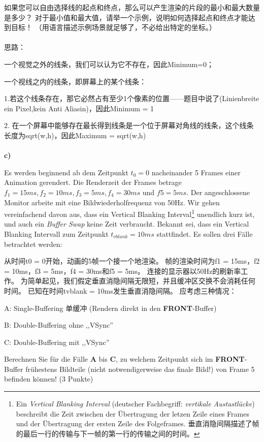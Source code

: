 \documentclass[fleqn]{article}
\begin{document}
如果您可以自由选择线的起点和终点，那么可以产生渲染的片段的最小和最大数量是多少？ 对于最小值和最大值，请举一个示例，说明如何选择起点和终点才能达到目标！ （用语言描述示例场景就足够了，不必给出特定的坐标。）
\\
\\
思路：

一个视觉之外的线条，我们可以认为它不存在，因此Minimum=0；

一个视线之内的线条，即屏幕上的某个线条：

1.若这个线条存在，那它必然占有至少1个像素的位置——题目中说了(Linienbreite ein Pixel,kein Anti Aliasin)，因此Minimum = 1

2. 在一个屏幕中能够存在最长得到线条是一个位于屏幕对角线的线条，这个线条长度为sqrt(w,h)，因此Maximum = sqrt(w,h)
\\
\\
\textbf{c)}

Es werden beginnend ab dem Zeitpunkt $t_0 = 0$ nacheinander 5 Frames einer Animation gerendert. 
 Die Renderzeit der Frames betrage $f_1 = 15ms, f_2 = 10ms, f_3 = 5ms, f_4 = 30ms$ und $f5 = 5ms$.
 Der angeschlossene Monitor arbeite mit eine Bildwiederholfrequenz von 50Hz. 
 Wir gehen vereinfachend davon aus, dass ein Vertical Blanking Interval\footnote{Ein \textit{Vertical Blanking Interval} (deutscher Fachbegriff: \textit{vertikale Austastlücke}) beschreibt die Zeit zwischen der Übertragung der letzen Zeile eines Frames und der Übertragung der ersten Zeile des Folgeframes. 垂直消隐间隔描述了帧的最后一行的传输与下一帧的第一行的传输之间的时间。} unendlich kurz ist, und auch ein \textit{Buffer Swap} keine Zeit verbraucht. Bekannt sei, dass ein Vertical Blanking Intervall zum Zeitpunkt $t_{vblank} = 10ms$ stattfindet. Es sollen drei Fälle betrachtet werden:

从时间t0 = 0开始，动画的5帧一个接一个地渲染。 帧的渲染时间为f1 = 15ms，f2 = 10ms，f3 = 5ms，f4 = 30ms和f5 = 5ms。 连接的显示器以50Hz的刷新率工作。 为简单起见，我们假定垂直消隐间隔无限短，并且缓冲区交换不会消耗任何时间。 已知在时间tvblank = 10ms发生垂直消隐间隔。 应考虑三种情况：

 A: Single-Buffering 单缓冲 (Rendern direkt in den \textbf{FRONT}-Buffer) 
 
 B: Double-Buffering ohne ,,VSync'' 
 
 C: Double-Buffering mit ,,VSync''

Berechnen Sie für die Fälle \textbf{A} bis \textbf{C}, zu welchem Zeitpunkt sich im \textbf{FRONT}-Buffer frühestens Bildteile (nicht notwendigerweise das finale Bild!) von Frame 5 befinden können! (3 Punkte)
\end{document}
